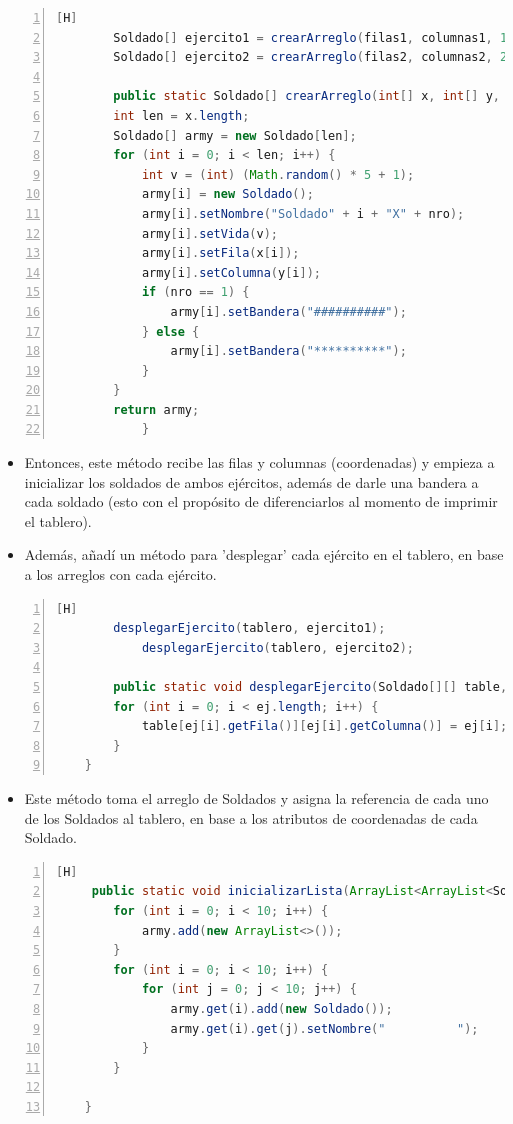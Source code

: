 \documentclass{article}
\begin{document}
	\begin{lstlisting}[language=java,caption={Creando ejércitos}, numbers=left][H]
		Soldado[] ejercito1 = crearArreglo(filas1, columnas1, 1);
		Soldado[] ejercito2 = crearArreglo(filas2, columnas2, 2);
		
		public static Soldado[] crearArreglo(int[] x, int[] y, int nro) {
        int len = x.length;
        Soldado[] army = new Soldado[len];
        for (int i = 0; i < len; i++) {
            int v = (int) (Math.random() * 5 + 1);
            army[i] = new Soldado();
            army[i].setNombre("Soldado" + i + "X" + nro);
            army[i].setVida(v);
            army[i].setFila(x[i]);
            army[i].setColumna(y[i]);
            if (nro == 1) {
                army[i].setBandera("##########");
            } else {
                army[i].setBandera("**********");
            }
        }
        return army;
    		}
	\end{lstlisting}
	\begin{itemize}	
		\item Entonces, este método recibe las filas y columnas (coordenadas) y empieza a inicializar los soldados de ambos ejércitos, además de darle una bandera a cada soldado (esto con el propósito de diferenciarlos al momento de imprimir el tablero).
		\item Además, añadí un método para 'desplegar' cada ejército en el tablero, en base a los arreglos con cada ejército.
	\end{itemize}
	\begin{lstlisting}[language=java,caption={Desplegando los ejércitos}, numbers=left][H]
		desplegarEjercito(tablero, ejercito1);
    		desplegarEjercito(tablero, ejercito2);
    		
    	public static void desplegarEjercito(Soldado[][] table, Soldado[] ej) {
        for (int i = 0; i < ej.length; i++) {
            table[ej[i].getFila()][ej[i].getColumna()] = ej[i];
        }
    }
	\end{lstlisting}	
	\begin{itemize}	
		\item Este método toma el arreglo de Soldados y asigna la referencia de cada uno de los Soldados al tablero, en base a los atributos de coordenadas de cada Soldado.
	\end{itemize}
	\begin{lstlisting}[language=java,caption={Inicializar la lista}, numbers=left][H]
	 public static void inicializarLista(ArrayList<ArrayList<Soldado>> army) {
        for (int i = 0; i < 10; i++) {
            army.add(new ArrayList<>());
        }
        for (int i = 0; i < 10; i++) {
            for (int j = 0; j < 10; j++) {
                army.get(i).add(new Soldado());
                army.get(i).get(j).setNombre("          ");
            }
        }

    }
	\end{lstlisting}
\end{document}

